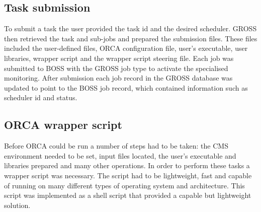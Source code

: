 


\subsection{Task submission}
To submit a task the user provided the task id and the desired scheduler. GROSS then retrieved the task and sub-jobs and prepared the submission files. These files included the user-defined files, ORCA configuration file, user's executable, user libraries, wrapper script and the wrapper script steering file. Each job was submitted to BOSS with the GROSS job type to activate the specialised monitoring. After submission each job record in the GROSS database was updated to point to the BOSS job record, which contained information such as scheduler id and status.


\subsection{ORCA wrapper script}
%
Before ORCA could be run a number of steps had to be taken: the CMS environment needed to be set, input files  located, the user's executable and libraries prepared and many other operations. In order to perform these tasks a wrapper script was necessary. The script had to be lightweight, fast and capable of running on many different types of operating system and architecture. This script was implemented as a shell script that provided a capable but lightweight solution.

